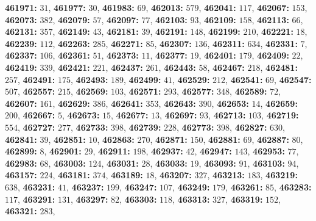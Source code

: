 \textsf{\bfseries 461971:} $31$, \textsf{\bfseries 461977:} $30$, \textsf{\bfseries 461983:} $69$, \textsf{\bfseries 462013:} $579$, \textsf{\bfseries 462041:} $117$, \textsf{\bfseries 462067:} $153$, \textsf{\bfseries 462073:} $382$, \textsf{\bfseries 462079:} $57$, \textsf{\bfseries 462097:} $77$, \textsf{\bfseries 462103:} $93$, \textsf{\bfseries 462109:} $158$, \textsf{\bfseries 462113:} $66$, \textsf{\bfseries 462131:} $357$, \textsf{\bfseries 462149:} $43$, \textsf{\bfseries 462181:} $39$, \textsf{\bfseries 462191:} $148$, \textsf{\bfseries 462199:} $210$, \textsf{\bfseries 462221:} $18$, \textsf{\bfseries 462239:} $112$, \textsf{\bfseries 462263:} $285$, \textsf{\bfseries 462271:} $85$, \textsf{\bfseries 462307:} $136$, \textsf{\bfseries 462311:} $634$, \textsf{\bfseries 462331:} $7$, \textsf{\bfseries 462337:} $106$, \textsf{\bfseries 462361:} $51$, \textsf{\bfseries 462373:} $11$, \textsf{\bfseries 462377:} $19$, \textsf{\bfseries 462401:} $179$, \textsf{\bfseries 462409:} $22$, \textsf{\bfseries 462419:} $339$, \textsf{\bfseries 462421:} $221$, \textsf{\bfseries 462437:} $261$, \textsf{\bfseries 462443:} $58$, \textsf{\bfseries 462467:} $218$, \textsf{\bfseries 462481:} $257$, \textsf{\bfseries 462491:} $175$, \textsf{\bfseries 462493:} $189$, \textsf{\bfseries 462499:} $41$, \textsf{\bfseries 462529:} $212$, \textsf{\bfseries 462541:} $69$, \textsf{\bfseries 462547:} $507$, \textsf{\bfseries 462557:} $215$, \textsf{\bfseries 462569:} $103$, \textsf{\bfseries 462571:} $293$, \textsf{\bfseries 462577:} $348$, \textsf{\bfseries 462589:} $72$, \textsf{\bfseries 462607:} $161$, \textsf{\bfseries 462629:} $386$, \textsf{\bfseries 462641:} $353$, \textsf{\bfseries 462643:} $390$, \textsf{\bfseries 462653:} $14$, \textsf{\bfseries 462659:} $200$, \textsf{\bfseries 462667:} $5$, \textsf{\bfseries 462673:} $15$, \textsf{\bfseries 462677:} $13$, \textsf{\bfseries 462697:} $93$, \textsf{\bfseries 462713:} $103$, \textsf{\bfseries 462719:} $554$, \textsf{\bfseries 462727:} $277$, \textsf{\bfseries 462733:} $398$, \textsf{\bfseries 462739:} $228$, \textsf{\bfseries 462773:} $398$, \textsf{\bfseries 462827:} $630$, \textsf{\bfseries 462841:} $39$, \textsf{\bfseries 462851:} $10$, \textsf{\bfseries 462863:} $270$, \textsf{\bfseries 462871:} $150$, \textsf{\bfseries 462881:} $69$, \textsf{\bfseries 462887:} $80$, \textsf{\bfseries 462899:} $8$, \textsf{\bfseries 462901:} $29$, \textsf{\bfseries 462911:} $198$, \textsf{\bfseries 462937:} $42$, \textsf{\bfseries 462947:} $143$, \textsf{\bfseries 462953:} $77$, \textsf{\bfseries 462983:} $68$, \textsf{\bfseries 463003:} $124$, \textsf{\bfseries 463031:} $28$, \textsf{\bfseries 463033:} $19$, \textsf{\bfseries 463093:} $91$, \textsf{\bfseries 463103:} $94$, \textsf{\bfseries 463157:} $224$, \textsf{\bfseries 463181:} $374$, \textsf{\bfseries 463189:} $18$, \textsf{\bfseries 463207:} $327$, \textsf{\bfseries 463213:} $183$, \textsf{\bfseries 463219:} $638$, \textsf{\bfseries 463231:} $41$, \textsf{\bfseries 463237:} $199$, \textsf{\bfseries 463247:} $107$, \textsf{\bfseries 463249:} $179$, \textsf{\bfseries 463261:} $85$, \textsf{\bfseries 463283:} $117$, \textsf{\bfseries 463291:} $131$, \textsf{\bfseries 463297:} $82$, \textsf{\bfseries 463303:} $118$, \textsf{\bfseries 463313:} $327$, \textsf{\bfseries 463319:} $152$, \textsf{\bfseries 463321:} $283$, 
